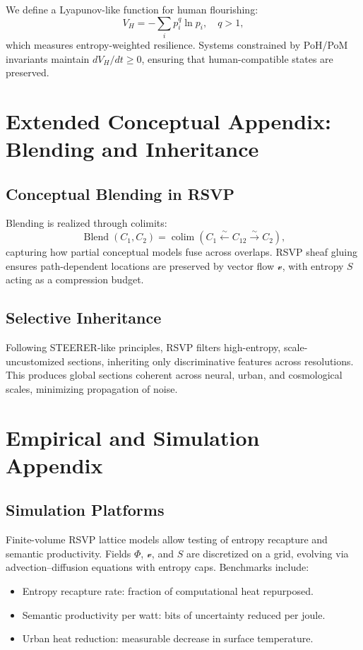 \documentclass[12pt]{article}
\begin{document}
We define a Lyapunov-like function for human flourishing:
\[
V_H = -\sum_i p_i^q \ln p_i, \quad q>1,
\]
which measures entropy-weighted resilience. Systems constrained by PoH/PoM invariants maintain $dV_H/dt \geq 0$, ensuring that human-compatible states are preserved.

\section{Extended Conceptual Appendix: Blending and Inheritance}

\subsection{Conceptual Blending in RSVP}

Blending is realized through colimits:
\[
\operatorname{Blend}(C_1,C_2) = \operatorname{colim}\left( C_1 \xleftarrow{\sim} C_{12} \xrightarrow{\sim} C_2 \right),
\]
capturing how partial conceptual models fuse across overlaps. RSVP sheaf gluing ensures path-dependent locations are preserved by vector flow $\mathcal{v}$, with entropy $S$ acting as a compression budget.

\subsection{Selective Inheritance}

Following STEERER-like principles, RSVP filters high-entropy, scale-uncustomized sections, inheriting only discriminative features across resolutions. This produces global sections coherent across neural, urban, and cosmological scales, minimizing propagation of noise.


\section{Empirical and Simulation Appendix}

\subsection{Simulation Platforms}

Finite-volume RSVP lattice models allow testing of entropy recapture and semantic productivity. Fields $\Phi$, $\mathcal{v}$, and $S$ are discretized on a grid, evolving via advection–diffusion equations with entropy caps. Benchmarks include:
\begin{itemize}
    \item Entropy recapture rate: fraction of computational heat repurposed.
    \item Semantic productivity per watt: bits of uncertainty reduced per joule.
    \item Urban heat reduction: measurable decrease in surface temperature.
\end{itemize}
\end{document}
